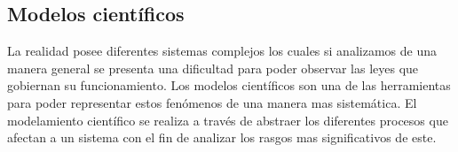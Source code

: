 \subsection{Modelos científicos}

La realidad posee diferentes sistemas complejos los cuales si analizamos de una manera general se presenta una dificultad para poder observar las leyes que gobiernan su funcionamiento. Los modelos científicos son una de las herramientas para poder representar estos fenómenos de una manera mas sistemática.
El modelamiento científico se realiza a través de abstraer los diferentes procesos que afectan a un sistema con el fin de analizar los rasgos mas significativos de este.

